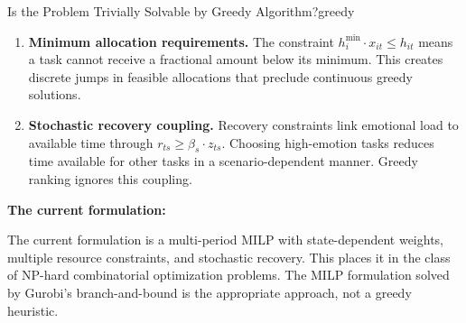 \documentclass[11pt,a4paper]{article}
\begin{document}
\begin{questionbox}{Is the Problem Trivially Solvable by Greedy Algorithm?}{greedy}
\begin{enumerate}
    \item \textbf{Minimum allocation requirements.} The constraint $h_i^{\min} \cdot x_{it} \leq h_{it}$ means a task cannot receive a fractional amount below its minimum. This creates discrete jumps in feasible allocations that preclude continuous greedy solutions.
    
    \item \textbf{Stochastic recovery coupling.} Recovery constraints link emotional load to available time through $r_{ts} \geq \beta_s \cdot z_{ts}$. Choosing high-emotion tasks reduces time available for other tasks in a scenario-dependent manner. Greedy ranking ignores this coupling.
\end{enumerate}

\textbf{The current formulation:}

The current formulation is a multi-period MILP with state-dependent weights, multiple resource constraints, and stochastic recovery. This places it in the class of NP-hard combinatorial optimization problems. The MILP formulation solved by Gurobi's branch-and-bound is the appropriate approach, not a greedy heuristic.
\end{questionbox}
\end{document}
